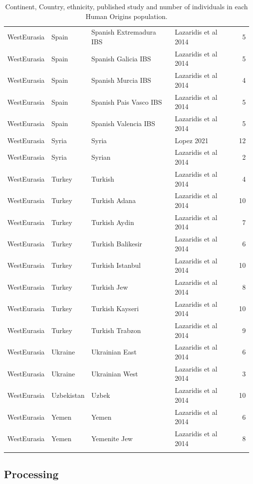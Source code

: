 \begin{longtable}[t]{lll>{\raggedright\arraybackslash}p{9em}r}
WestEurasia & Spain & Spanish Extremadura IBS & Lazaridis et al 2014 & 5\\
WestEurasia & Spain & Spanish Galicia IBS & Lazaridis et al 2014 & 5\\
WestEurasia & Spain & Spanish Murcia IBS & Lazaridis et al 2014 & 4\\
WestEurasia & Spain & Spanish Pais Vasco IBS & Lazaridis et al 2014 & 5\\
WestEurasia & Spain & Spanish Valencia IBS & Lazaridis et al 2014 & 5\\
WestEurasia & Syria & Syria & Lopez 2021 & 12\\
WestEurasia & Syria & Syrian & Lazaridis et al 2014 & 2\\
WestEurasia & Turkey & Turkish & Lazaridis et al 2014 & 4\\
WestEurasia & Turkey & Turkish Adana & Lazaridis et al 2014 & 10\\
WestEurasia & Turkey & Turkish Aydin & Lazaridis et al 2014 & 7\\
WestEurasia & Turkey & Turkish Balikesir & Lazaridis et al 2014 & 6\\
WestEurasia & Turkey & Turkish Istanbul & Lazaridis et al 2014 & 10\\
WestEurasia & Turkey & Turkish Jew & Lazaridis et al 2014 & 8\\
WestEurasia & Turkey & Turkish Kayseri & Lazaridis et al 2014 & 10\\
WestEurasia & Turkey & Turkish Trabzon & Lazaridis et al 2014 & 9\\
WestEurasia & Ukraine & Ukrainian East & Lazaridis et al 2014 & 6\\
WestEurasia & Ukraine & Ukrainian West & Lazaridis et al 2014 & 3\\
WestEurasia & Uzbekistan & Uzbek & Lazaridis et al 2014 & 10\\
WestEurasia & Yemen & Yemen & Lazaridis et al 2014 & 6\\
WestEurasia & Yemen & Yemenite Jew & Lazaridis et al 2014 & 8\\
\bottomrule
\caption{Continent, Country, ethnicity, published study and number of individuals in each Human Origins population. }
\end{longtable}
\endgroup{}




\subsection{Processing}

